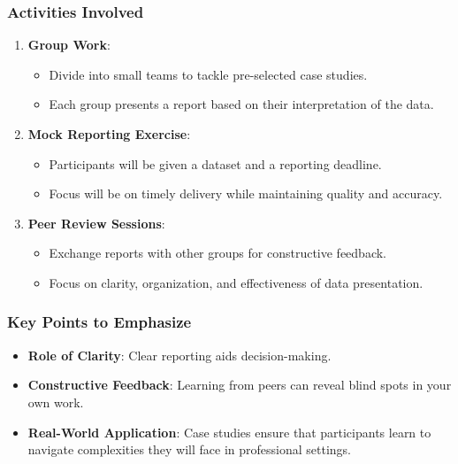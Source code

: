 \documentclass{beamer}
\begin{document}
\begin{frame}[fragile]
    \frametitle{Activities Involved}
    \begin{enumerate}
        \item \textbf{Group Work}: 
            \begin{itemize}
                \item Divide into small teams to tackle pre-selected case studies.
                \item Each group presents a report based on their interpretation of the data.
            \end{itemize}

        \item \textbf{Mock Reporting Exercise}:
            \begin{itemize}
                \item Participants will be given a dataset and a reporting deadline.
                \item Focus will be on timely delivery while maintaining quality and accuracy.
            \end{itemize}

        \item \textbf{Peer Review Sessions}:
            \begin{itemize}
                \item Exchange reports with other groups for constructive feedback.
                \item Focus on clarity, organization, and effectiveness of data presentation.
            \end{itemize}
    \end{enumerate}
\end{frame}

\begin{frame}[fragile]
    \frametitle{Key Points to Emphasize}
    \begin{itemize}
        \item \textbf{Role of Clarity}: Clear reporting aids decision-making.
        \item \textbf{Constructive Feedback}: Learning from peers can reveal blind spots in your own work.
        \item \textbf{Real-World Application}: Case studies ensure that participants learn to navigate complexities they will face in professional settings.
    \end{itemize}
\end{frame}
\end{document}
